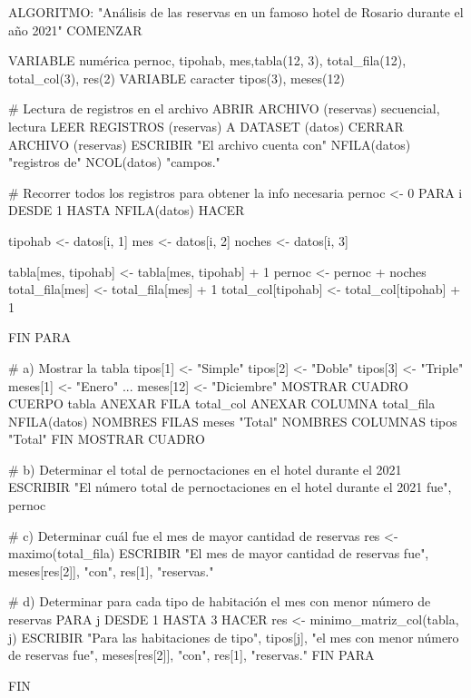 \documentclass[
]{book}
\newenvironment{Shaded}{\begin{snugshade}}{\end{snugshade}}
\newcommand{\NormalTok}[1]{#1}
\begin{document}
\begin{Shaded}
\begin{Highlighting}[]
\NormalTok{ALGORITMO: "Análisis de las reservas en un famoso hotel de Rosario durante el año 2021"}
\NormalTok{COMENZAR}
    
\NormalTok{  VARIABLE numérica pernoc, tipohab, mes,tabla(12, 3), total\_fila(12), total\_col(3), res(2)}
\NormalTok{  VARIABLE caracter tipos(3), meses(12)}

\NormalTok{  \# Lectura de registros en el archivo}
\NormalTok{  ABRIR ARCHIVO (reservas) secuencial, lectura}
\NormalTok{  LEER REGISTROS (reservas) A DATASET (datos)}
\NormalTok{  CERRAR ARCHIVO (reservas)}
\NormalTok{  ESCRIBIR "El archivo cuenta con" NFILA(datos) "registros de" NCOL(datos) "campos." }

\NormalTok{  \# Recorrer todos los registros para obtener la info necesaria}
\NormalTok{  pernoc \textless{}{-} 0}
\NormalTok{  PARA i DESDE 1 HASTA NFILA(datos) HACER}
    
\NormalTok{    tipohab \textless{}{-} datos[i, 1]}
\NormalTok{    mes \textless{}{-} datos[i, 2]}
\NormalTok{    noches \textless{}{-} datos[i, 3]}
    
\NormalTok{    tabla[mes, tipohab] \textless{}{-} tabla[mes, tipohab] + 1}
\NormalTok{    pernoc \textless{}{-} pernoc + noches}
\NormalTok{    total\_fila[mes] \textless{}{-} total\_fila[mes] + 1}
\NormalTok{    total\_col[tipohab] \textless{}{-} total\_col[tipohab] + 1}
    
\NormalTok{  FIN PARA}

\NormalTok{  \# a) Mostrar la tabla}
\NormalTok{  tipos[1] \textless{}{-} "Simple"}
\NormalTok{  tipos[2] \textless{}{-} "Doble"}
\NormalTok{  tipos[3] \textless{}{-} "Triple"}
\NormalTok{  meses[1] \textless{}{-} "Enero"}
\NormalTok{  ...}
\NormalTok{  meses[12] \textless{}{-} "Diciembre"}
\NormalTok{  MOSTRAR CUADRO}
\NormalTok{    CUERPO tabla}
\NormalTok{    ANEXAR FILA total\_col}
\NormalTok{    ANEXAR COLUMNA total\_fila NFILA(datos)}
\NormalTok{    NOMBRES FILAS meses "Total"}
\NormalTok{    NOMBRES COLUMNAS  tipos "Total"}
\NormalTok{  FIN MOSTRAR CUADRO}

\NormalTok{  \# b) Determinar el total de pernoctaciones en el hotel durante el 2021}
\NormalTok{  ESCRIBIR "El número total de pernoctaciones en el hotel durante el 2021 fue", pernoc}

\NormalTok{  \# c) Determinar cuál fue el mes de mayor cantidad de reservas}
\NormalTok{  res \textless{}{-} maximo(total\_fila)}
\NormalTok{  ESCRIBIR "El mes de mayor cantidad de reservas fue", meses[res[2]], "con", res[1], "reservas."}

\NormalTok{  \# d) Determinar para cada tipo de habitación el mes con menor número de reservas}
\NormalTok{  PARA j DESDE 1 HASTA 3 HACER}
\NormalTok{    res \textless{}{-} minimo\_matriz\_col(tabla, j)}
\NormalTok{    ESCRIBIR "Para las habitaciones de tipo", tipos[j], "el mes con menor número de reservas fue", meses[res[2]], "con", res[1], "reservas."}
\NormalTok{  FIN PARA}
   
\NormalTok{FIN}
\end{Highlighting}
\end{Shaded}
\end{document}
